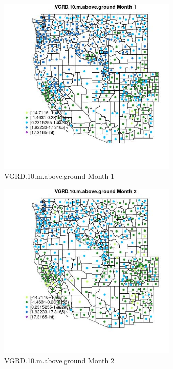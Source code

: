 \begin{figure} 
\centering  
\includegraphics[width=0.77\textwidth]{Code_Outputs/df_report_ML_predictors_CountyCentroid_Locations_Dates_2008-01-01to2018-12-31_MapObsMo1VGRD10maboveground.jpg} 
\caption{\label{fig:df_report_ML_predictors_CountyCentroid_Locations_Dates_2008-01-01to2018-12-31MapObsMo1VGRD10maboveground}VGRD.10.m.above.ground Month 1} 
\end{figure} 
 

\clearpage 

\begin{figure} 
\centering  
\includegraphics[width=0.77\textwidth]{Code_Outputs/df_report_ML_predictors_CountyCentroid_Locations_Dates_2008-01-01to2018-12-31_MapObsMo2VGRD10maboveground.jpg} 
\caption{\label{fig:df_report_ML_predictors_CountyCentroid_Locations_Dates_2008-01-01to2018-12-31MapObsMo2VGRD10maboveground}VGRD.10.m.above.ground Month 2} 
\end{figure} 
 

